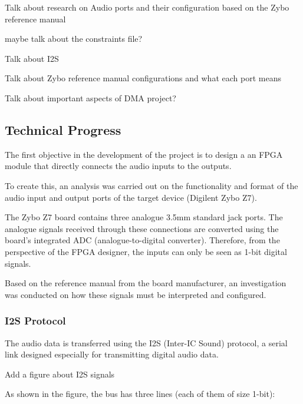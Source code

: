 Talk about research on Audio ports and their configuration based on the Zybo reference manual

maybe talk about the constraints file?


Talk about I2S

Talk about Zybo reference manual configurations and what each port means

Talk about important aspects of DMA project?


\subsection*{Technical Progress}


The first objective in the development of the project is to design a an FPGA module that directly connects the audio inputs to the outputs.

To create this, an analysis was carried out on the functionality and format of the audio input and output ports of the target device (Digilent Zybo Z7).

The Zybo Z7 board contains three analogue 3.5mm standard jack ports. The analogue signals received through these connections are converted using the board's integrated ADC (analogue-to-digital converter). Therefore, from the perspective of the FPGA designer, the inputs can only be seen as 1-bit digital signals.

Based on the reference manual from the board manufacturer, an investigation was conducted on how these signals must be interpreted and configured.

\subsubsection{I2S Protocol}
The audio data is transferred using the I2S (Inter-IC Sound) protocol, a serial link designed especially for transmitting digital audio data.


Add a figure about I2S signals


As shown in the figure, the bus has three lines (each of them of size 1-bit):

